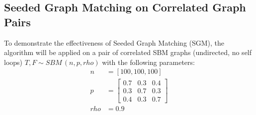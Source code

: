 \documentclass[letterpaper,10pt,english]{jupyterBook}
\begin{document}
\subsection{Seeded Graph Matching on Correlated Graph Pairs}
\label{\detokenize{applications/ch9/graph-matching-vertex:seeded-graph-matching-on-correlated-graph-pairs}}
\sphinxAtStartPar
To demonstrate the effectiveness of Seeded Graph Matching (SGM), the algorithm will be applied on a pair of correlated SBM graphs (undirected, no self loops) \(T, F \sim SBM\,(n, p, rho)\)  with the following parameters:
\begin{align*}
n &= [100, 100, 100]\\
p &= \begin{bmatrix} 
0.7 & 0.3 & 0.4\\
0.3 & 0.7 & 0.3\\
0.4 & 0.3 & 0.7
\end{bmatrix}\\
rho &= 0.9
\end{align*}
\end{document}
